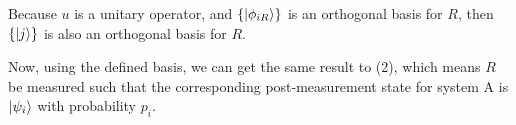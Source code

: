 \begin{enumerate}[(1)]
    Because $u$ is a unitary operator, and $\{\ket{\phi_{iR}}\}$ is an orthogonal basis for $R$, then $\{\ket{j}\}$ is also an orthogonal basis for $R$.
    
    Now, using the defined basis, we can get the same result to (2), which means $R$ be measured such that the corresponding post-measurement state for system A is $\ket{\psi_i}$ with probability $p_i$.
\end{enumerate}